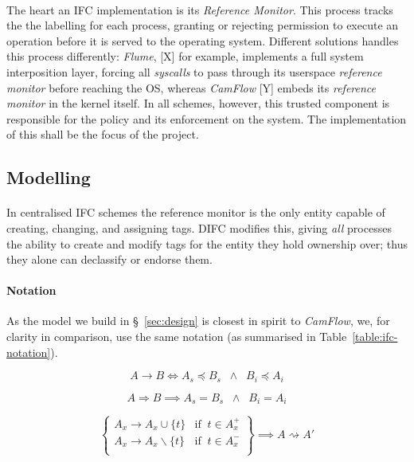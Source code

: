 \paragraph{} The heart an IFC implementation is its \textit{Reference Monitor}. This process tracks the the labelling for each process, granting or rejecting permission to execute an operation before it is served to the operating system. Different solutions handles this process differently: \textit{Flume}, [X] for example, implements a full system interposition layer, forcing all \textit{syscalls} to pass through its userspace \textit{reference monitor} before reaching the OS, whereas \textit{CamFlow} [Y] embeds its \textit{reference monitor} in the kernel itself. In all schemes, however, this trusted component is responsible for the policy and its enforcement on the system. The implementation of this shall be the focus of the project.


\subsection{Modelling}

\paragraph{} In centralised IFC schemes the reference monitor is the only entity capable of creating, changing, and assigning tags. DIFC modifies this, giving \textit{all} processes the ability to create and modify tags for the entity they hold ownership over; thus they alone can declassify or endorse them.

\paragraph{Notation} As the model we build in §~\ref{sec:design} is closest in spirit to \textit{CamFlow}, we, for clarity in comparison, use the same notation (as summarised in Table~\ref{table:ifc-notation}).

\begin{equation}
    A \rightarrow B \iff A_s \preceq B_s \;\; \land \;\; B_i \preceq A_i \tag{$\alpha$}
  \end{equation}

\begin{equation}
    A \Rightarrow B \implies A_s = B_s \;\; \land \;\; B_i = A_i \tag{$\beta$}
\end{equation}

\begin{equation}
    \left\{\begin{array}{lr}
        A_x \rightarrow A_x \cup \{t\} & \text{if} \;\; t \in A_{x}^{+} \\
        A_x \rightarrow A_x \smallsetminus \{t\} & \text{if} \;\; t \in A_{x}^{-} \\
    \end{array}\right\} \implies A \rightsquigarrow A' \tag{$\gamma$}
\end{equation}

